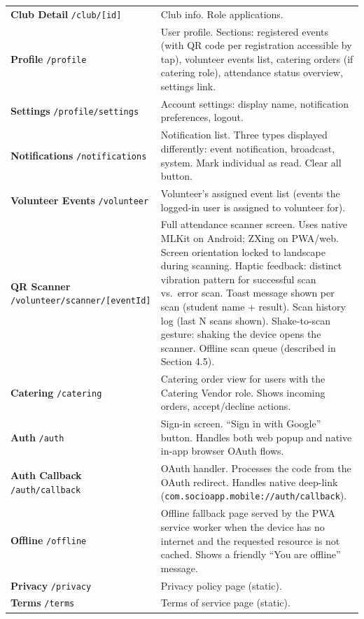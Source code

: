 \documentclass[12pt,a4paper]{article}
\begin{document}
\begin{longtable}{L{5cm} X}
\addlinespace
\textbf{Club Detail} \texttt{/club/[id]} & Club info. Role applications. \\
\addlinespace
\textbf{Profile} \texttt{/profile} & User profile. Sections: registered events (with QR code per registration accessible by tap), volunteer events list, catering orders (if catering role), attendance status overview, settings link. \\
\addlinespace
\textbf{Settings} \texttt{/profile/settings} & Account settings: display name, notification preferences, logout. \\
\addlinespace
\textbf{Notifications} \texttt{/notifications} & Notification list. Three types displayed differently: event notification, broadcast, system. Mark individual as read. Clear all button. \\
\addlinespace
\textbf{Volunteer Events} \texttt{/volunteer} & Volunteer's assigned event list (events the logged-in user is assigned to volunteer for). \\
\addlinespace
\textbf{QR Scanner} \texttt{/volunteer/scanner/[eventId]} & Full attendance scanner screen. Uses native MLKit on Android; ZXing on PWA/web. Screen orientation locked to landscape during scanning. Haptic feedback: distinct vibration pattern for successful scan vs.\ error scan. Toast message shown per scan (student name + result). Scan history log (last N scans shown). Shake-to-scan gesture: shaking the device opens the scanner. Offline scan queue (described in Section 4.5). \\
\addlinespace
\textbf{Catering} \texttt{/catering} & Catering order view for users with the Catering Vendor role. Shows incoming orders, accept/decline actions. \\
\addlinespace
\textbf{Auth} \texttt{/auth} & Sign-in screen. ``Sign in with Google'' button. Handles both web popup and native in-app browser OAuth flows. \\
\addlinespace
\textbf{Auth Callback} \texttt{/auth/callback} & OAuth handler. Processes the code from the OAuth redirect. Handles native deep-link (\texttt{com.socioapp.mobile://auth/callback}). \\
\addlinespace
\textbf{Offline} \texttt{/offline} & Offline fallback page served by the PWA service worker when the device has no internet and the requested resource is not cached. Shows a friendly ``You are offline'' message. \\
\addlinespace
\textbf{Privacy} \texttt{/privacy} & Privacy policy page (static). \\
\addlinespace
\textbf{Terms} \texttt{/terms} & Terms of service page (static). \\
\bottomrule
\end{longtable}
\end{document}
